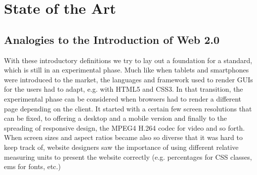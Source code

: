 


\chapter{State of the Art}
\label{stateofzart}










\section{Analogies to the Introduction of Web 2.0}



With these introductory definitions we try to lay out a foundation for a standard, which is still in an experimental phase. Much like when tablets and smartphones were introduced to the market, the languages and framework used to render GUIs for the users had to adapt, e.g. with HTML5 and CSS3. In that transition, the experimental phase can be considered when browsers had to render a different page depending on the client. It started with a certain few screen resolutions that can be fixed, to offering a desktop and a mobile version and finally to the spreading of responsive design, the MPEG4 H.264 codec for video and so forth. When screen sizes and aspect ratios became also so diverse that it was hard to keep track of, website designers saw the importance of using different relative measuring units to present the website correctly (e.g. percentages for CSS classes, ems for fonts, etc.)




